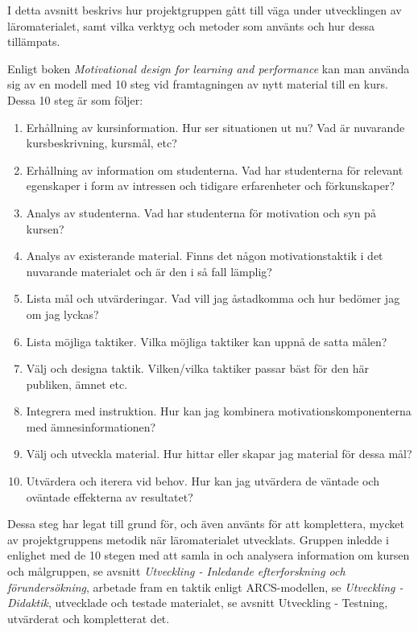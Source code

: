 \documentclass[]{article}
\begin{document}


I detta avsnitt beskrivs hur projektgruppen gått till väga under utvecklingen av läromaterialet, samt vilka verktyg och
metoder som använts och hur dessa tillämpats.

Enligt boken \textit{Motivational design for learning and performance} kan man använda sig av en modell med 10 steg vid
framtagningen av nytt material till en kurs. Dessa 10 steg är som följer:

\begin{enumerate}
  \item Erhållning av kursinformation. Hur ser situationen ut nu? Vad är nuvarande kursbeskrivning, kursmål, etc?
  \item Erhållning av information om studenterna. Vad har studenterna för relevant egenskaper i form av intressen och
  tidigare erfarenheter och förkunskaper?
  \item Analys av studenterna. Vad har studenterna för motivation och syn på kursen?
  \item Analys av existerande material. Finns det någon motivationstaktik i det nuvarande materialet och är den i så
  fall lämplig?
  \item Lista mål och utvärderingar. Vad vill jag åstadkomma och hur bedömer jag om jag lyckas?
  \item Lista möjliga taktiker. Vilka möjliga taktiker kan uppnå de satta målen?
  \item Välj och designa taktik. Vilken/vilka taktiker passar bäst för den här publiken, ämnet etc.
  \item Integrera med instruktion. Hur kan jag kombinera motivationskomponenterna med ämnesinformationen?
  \item Välj och utveckla material. Hur hittar eller skapar jag material för dessa mål?
  \item Utvärdera och iterera vid behov. Hur kan jag utvärdera de väntade och oväntade effekterna av resultatet?
\end{enumerate}


Dessa steg har legat till grund för, och även använts för att komplettera, mycket av projektgruppens metodik när
läromaterialet utvecklats. Gruppen inledde i enlighet med de 10 stegen med att samla in och analysera information om
kursen och målgruppen, se avsnitt \textit{Utveckling - Inledande efterforskning och förundersökning}, arbetade fram en taktik
enligt ARCS-modellen, se \textit{Utveckling - Didaktik}, utvecklade och testade materialet, se avsnitt
{Utveckling - Testning}, utvärderat och kompletterat det.
\end{document}
